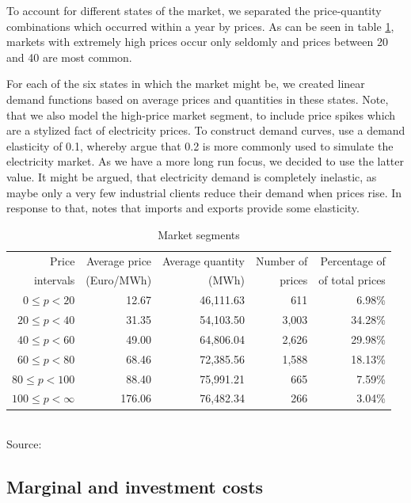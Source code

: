 To account for different states of the market, we separated the price-quantity combinations which occurred within a year by prices. As can be seen in table \ref{tab:marketsegments}, markets with extremely high prices occur only seldomly and prices between 20 and 40 are most common.

For each of the six states in which the market might be, we created linear demand functions based on average prices and quantities in these states. Note, that we also model the high-price market segment, to include price spikes which are a stylized fact of electricity prices.  To construct demand curves, \cite{Neuhoff2005} use a demand elasticity of 0.1, whereby \cite{Genc2007} argue that 0.2 is more commonly used to simulate the electricity market. As we have a more long run focus, we decided to use the latter value. It might be argued, that electricity demand is completely inelastic, as maybe only a very few industrial clients reduce their demand when prices rise. In response to that, \cite{Bushnell2003} notes that imports and exports provide some elasticity.

\begin{table}[ht]
\centering
\caption{Market segments}\label{tab:marketsegments}
\begin{tabular}{rrrrr}
  \hline
Price & Average price  & Average quantity & Number of & Percentage of \\
intervals& (Euro/MWh) &  (MWh) &  prices & of total prices\\
  \hline\hline
$0\leq p<20$ & 12.67 & 46,111.63 & 611 & 6.98\% \\
$20\leq p<40$ & 31.35 & 54,103.50 & 3,003 & 34.28\% \\
$40\leq p<60$ & 49.00 & 64,806.04 & 2,626 & 29.98\% \\
$60\leq p<80$ & 68.46 & 72,385.56 & 1,588 & 18.13\% \\
$80\leq p<100$ & 88.40 & 75,991.21 & 665 & 7.59\% \\
$100\leq p<\infty$& 176.06 & 76,482.34 & 266 & 3.04\% \\
   \hline
\end{tabular}
\\
\vspace{0.3cm}
\scriptsize Source: \cite{EEX2006, UCTE2006}
\end{table}

\clearpage
\subsection{Marginal and investment costs}
\label{sec:marg-investm-costs}


